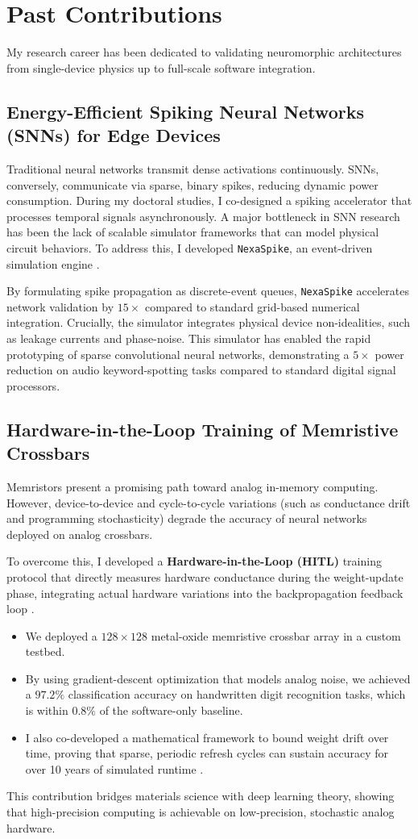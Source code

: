 \section{Past Contributions}

My research career has been dedicated to validating neuromorphic architectures from single-device physics up to full-scale software integration. 

\subsection{Energy-Efficient Spiking Neural Networks (SNNs) for Edge Devices}
Traditional neural networks transmit dense activations continuously. SNNs, conversely, communicate via sparse, binary spikes, reducing dynamic power consumption. During my doctoral studies, I co-designed a spiking accelerator that processes temporal signals asynchronously. A major bottleneck in SNN research has been the lack of scalable simulator frameworks that can model physical circuit behaviors. To address this, I developed \texttt{NexaSpike}, an event-driven simulation engine \cite{vance2024nexaspike}. 

By formulating spike propagation as discrete-event queues, \texttt{NexaSpike} accelerates network validation by $15\times$ compared to standard grid-based numerical integration. Crucially, the simulator integrates physical device non-idealities, such as leakage currents and phase-noise. This simulator has enabled the rapid prototyping of sparse convolutional neural networks, demonstrating a $5\times$ power reduction on audio keyword-spotting tasks compared to standard digital signal processors.

\subsection{Hardware-in-the-Loop Training of Memristive Crossbars}
Memristors present a promising path toward analog in-memory computing. However, device-to-device and cycle-to-cycle variations (such as conductance drift and programming stochasticity) degrade the accuracy of neural networks deployed on analog crossbars. 

To overcome this, I developed a \textbf{Hardware-in-the-Loop (HITL)} training protocol that directly measures hardware conductance during the weight-update phase, integrating actual hardware variations into the backpropagation feedback loop \cite{vance2023hardware}. 
\begin{itemize}
    \item We deployed a $128 \times 128$ metal-oxide memristive crossbar array in a custom testbed.
    \item By using gradient-descent optimization that models analog noise, we achieved a $97.2\%$ classification accuracy on handwritten digit recognition tasks, which is within $0.8\%$ of the software-only baseline.
    \item I also co-developed a mathematical framework to bound weight drift over time, proving that sparse, periodic refresh cycles can sustain accuracy for over 10 years of simulated runtime \cite{vance2025robust}.
\end{itemize}

This contribution bridges materials science with deep learning theory, showing that high-precision computing is achievable on low-precision, stochastic analog hardware.
